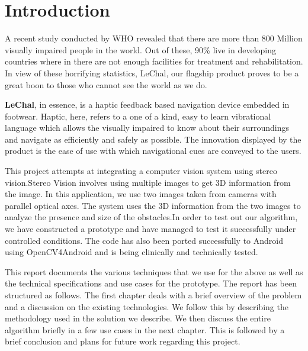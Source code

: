 \documentclass[11pt]{report}
\begin{document}
{\bigskip


\bigskip




\bigskip


\bigskip


\bigskip

\clearpage


\bigskip


\bigskip


\bigskip


\bigskip


\bigskip


\tableofcontents
\listoffigures
\listoftables
\chapter{Introduction}
A recent study conducted by WHO\cite{who} revealed that there are more than 800 Million visually impaired people in the world. Out of these, 90\% live in  developing countries 
where in there are not enough facilities for treatment and rehabilitation. In view of these horrifying statistics, LeChal\cite{lechal}, our flagship product proves to be a great boon to those who cannot see the world as we do.  

\textbf{LeChal}, in essence, is a haptic feedback based navigation device embedded in footwear. Haptic, here, refers to a one of a kind, easy to learn vibrational language which allows the visually impaired to know about their surroundings and navigate as efficiently and safely as possible. The innovation displayed by the product is the ease of use with which navigational cues are conveyed to the users. 

This project attempts at integrating a computer vision system using stereo vision.Stereo Vision\cite{gonzalez,HOGDisp} involves using multiple images to get 3D information from the image. In this application, we use two images taken from cameras with parallel optical axes. The system uses the 3D information from the two images to analyze the presence and size of the obstacles.In order to test out our algorithm, we have constructed a prototype and have managed to test it successfully under controlled conditions. The code has also been ported successfully to Android using OpenCV4Android\cite{Opencvandroid} and is being clinically and technically tested. 

This report documents the various techniques that we use for the above as well as the technical specifications and use cases for the prototype. The report has been structured as follows. The first chapter deals with a brief overview of the problem and a discussion on the existing technologies. We follow this by describing the methodology used in the solution we describe. We then discuss the entire algorithm briefly in a few use cases in the next chapter. This is followed by a brief conclusion and plans for future work regarding this project. 

}
\end{document}
